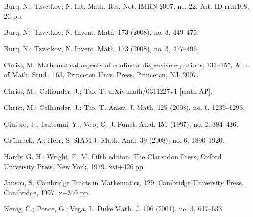 \documentclass[11pt]{amsart}
\numberwithin{equation}{section} \numberwithin{theorem}{section}
\begin{document}
\begin{thebibliography}{99}
Burq, N.; Tzvetkov, N.
	\newblock Int. Math. Res. Not. IMRN  2007,  no. 22, Art. ID rnm108, 26 pp. 

Burq, N.; Tzvetkov, N.
	 \newblock  Invent. Math.  173  (2008),  no. 3, 449--475.

	Burq, N.;  Tzvetkov, N.
	 \newblock  Invent. Math.  173  (2008),  no. 3, 477--496.

	Christ, M.
	\newblock   Mathematical aspects of nonlinear dispersive equations,  131--155,
Ann. of Math. Stud., 163, Princeton Univ. Press, Princeton, NJ, 2007. 

	Christ, M.; Colliander, J.; Tao, T.
	\newblock arXiv:math/0311227v1 [math.AP].
	
	Christ, M.; Colliander, J.; Tao, T.
	\newblock Amer. J. Math.  125  (2003),  no. 6, 1235--1293. 

	Ginibre, J.; Tsutsumi, Y.; Velo, G.
	\newblock J. Funct. Anal.  151  (1997),  no. 2, 384--436.

 

	Gr{\"u}nrock, A.; Herr, S.
	\newblock SIAM J. Math. Anal. 39 (2008), no. 6, 1890--1920. 
  

Hardy, G. H.; Wright, E. M. 
	 Fifth edition.
	\newblock The Clarendon Press, Oxford University Press, New York, 1979. xvi+426 pp. 

 Janson, S. 
\newblock Cambridge Tracts in Mathematics, 129. Cambridge University Press,
Cambridge, 1997. x+340 pp.

	Kenig, C.; Ponce, G.; Vega, L.
	\newblock  Duke Math. J.  106  (2001),  no. 3, 617--633.


\end{thebibliography}
\end{document}
